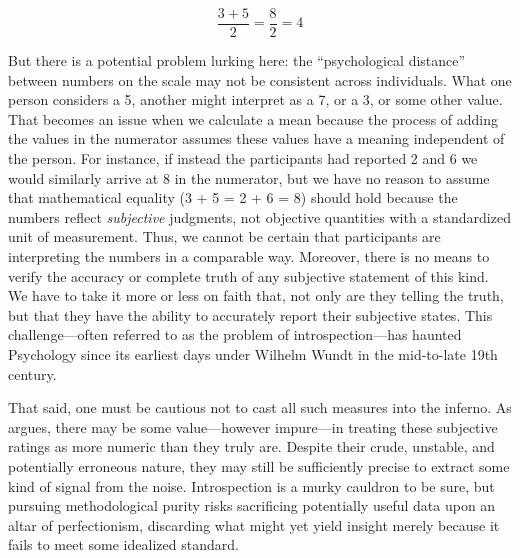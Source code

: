 \begin{equation}
\frac{3 + 5}{2} = \frac{8}{2} = 4
\end{equation}

But there is a potential problem lurking here: the ``psychological distance'' between numbers on the scale may not be consistent across individuals. What one person considers a 5, another might interpret as a 7, or a 3, or some other value. That becomes an issue when we calculate a mean because the process of adding the values in the numerator assumes these values have a meaning independent of the person. For instance, if instead the participants had reported 2 and 6 we would similarly arrive at 8 in the numerator, but we have no reason to assume that mathematical equality (3 + 5 = 2 + 6 = 8) should hold because the numbers reflect \textit{subjective} judgments, not objective quantities with a standardized unit of measurement. Thus, we cannot be certain that participants are interpreting the numbers in a comparable way. Moreover, there is no means to verify the accuracy or complete truth of any subjective statement of this kind. We have to take it more or less on faith that, not only are they telling the truth, but that they have the ability to accurately report their subjective states. This challenge—often referred to as the problem of introspection—has haunted Psychology since its earliest days under Wilhelm Wundt in the mid-to-late 19th century. 

That said, one must be cautious not to cast all such measures into the inferno. As \textcite{Labovitz1967} argues, there may be some value—however impure—in treating these subjective ratings as more numeric than they truly are. Despite their crude, unstable, and potentially erroneous nature, they may still be sufficiently precise to extract some kind of signal from the noise. Introspection is a murky cauldron to be sure, but pursuing methodological purity risks sacrificing potentially useful data upon an altar of perfectionism, discarding what might yet yield insight merely because it fails to meet some idealized standard.










